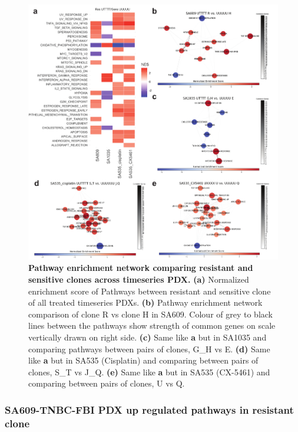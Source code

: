 \begin{figure}
\centering
  \includegraphics[width=\textwidth]{Figures/fig6resistantsensitivenetwork.pdf}
\caption[DE of resistant and sensitive clonealign defined clones]
	{\small
	\textbf{Pathway enrichment network comparing resistant and sensitive clones across timeseries PDX.}
	\textbf{(a)} Normalized enrichment score of Pathways between resistant and sensitive clone of all treated timeseries PDXs.
	    \textbf{(b)} Pathway enrichment network comparison of clone R vs clone H in SA609. Colour of grey to black lines between the pathways show strength of common genes on scale vertically drawn on right side. 
	     \textbf{(c)} Same like \textbf{a} but in SA1035  and comparing pathways between pairs of clones, G\_H vs E. 
	     \textbf{(d)} Same like \textbf{a} but in SA535 (Cisplatin) and comparing between pairs of clones, S\_T vs J\_Q.
	 \textbf{(e)} Same like \textbf{a} but in SA535 (CX-5461) and comparing between pairs of clones, U vs Q.}
	
	\label{fig:fig6resistantsensitivenetwork}
\end{figure}










\subsubsection{SA609-TNBC-FBI PDX up regulated pathways in resistant clone}



